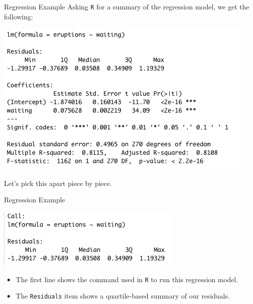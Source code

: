 \begin{frame}{Regression Example}
    Asking \texttt{R} for a summary of the regression model, we get the following:
    \begin{center}
        \includegraphics[scale=0.6]{images/regsum.png}
    \end{center}
    Let's pick this apart piece by piece.
\end{frame}

\begin{frame}{Regression Example}
    \begin{center}
        \includegraphics[scale=0.6]{images/regcall.png}
    \end{center}
    \begin{itemize}
        \item The first line shows the command used in \texttt{R} to run this regression model.
        \item The \texttt{Residuals} item shows a quartile-based summary of our residuals.
    \end{itemize}
\end{frame}

